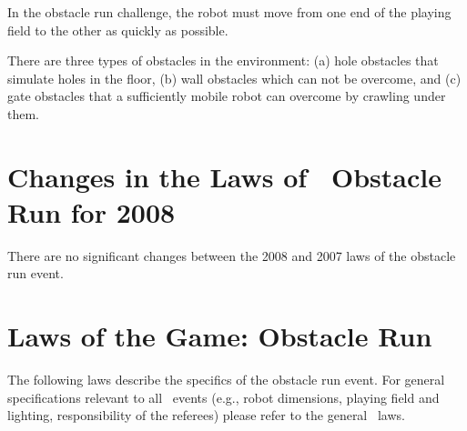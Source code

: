 \documentclass[12pt]{hurocup}
\begin{document}
In the obstacle run challenge, the robot must move from one end of the
playing field to the other as quickly as possible.

There are three types of obstacles in the environment: (a) hole
obstacles that simulate holes in the floor, (b) wall obstacles which
can not be overcome, and (c) gate obstacles that a sufficiently mobile
robot can overcome by crawling under them.

\section{Changes in the Laws of \HuroCup\ Obstacle Run for 2008}

There are no significant changes between the 2008 and 2007 laws of the
obstacle run event.

\section{Laws of the Game: Obstacle Run}
\label{sec:laws-obstacle-run}

The following laws describe the specifics of the obstacle run
event. For general specifications relevant to all \HuroCup\ events
(e.g., robot dimensions, playing field and lighting, responsibility of
the referees) please refer to the general \HuroCup\ laws.

\label{law:or-field}
\end{document}
